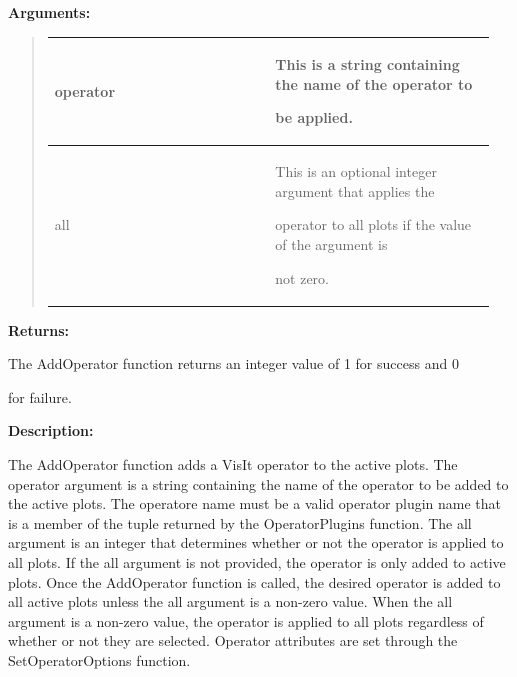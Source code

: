 \documentclass[letterpaper,10pt,english]{sphinxmanual}
\begin{document}
\begin{DUlineblock}{0em}
\item[] 
\item[] \textbf{Arguments:}
\end{DUlineblock}
\begin{quote}

\begin{tabular}{|p{0.475\linewidth}|p{0.475\linewidth}|}
\hline

operator
 & 
\begin{DUlineblock}{0em}
\item[] This is a string containing the name of the operator to
\item[] be applied.
\end{DUlineblock}
\\
\hline
all
 & 
\begin{DUlineblock}{0em}
\item[] This is an optional integer argument that applies the
\item[] operator to all plots if the value of the argument is
\item[] not zero.
\end{DUlineblock}
\\
\hline\end{tabular}

\end{quote}

\begin{DUlineblock}{0em}
\item[] 
\item[] \textbf{Returns:}
\item[] The AddOperator function returns an integer value of 1 for success and 0
\item[] for failure.
\item[] 
\item[] \textbf{Description:}
\item[] The AddOperator function adds a VisIt operator to the active plots. The
operator argument is a string containing the name of the operator to be
added to the active plots. The operatore name must be a valid operator
plugin name that is a member of the tuple returned by the OperatorPlugins
function. The all argument is an integer that determines
whether or not the operator is applied to all plots. If the all argument is
not provided, the operator is only added to active plots. Once the
AddOperator function is called, the desired operator is added to all
active plots unless the all argument is a non-zero value. When the all
argument is a non-zero value, the operator is applied to all plots
regardless of whether or not they are selected. Operator attributes are set
through the SetOperatorOptions function.
\end{DUlineblock}
\end{document}
